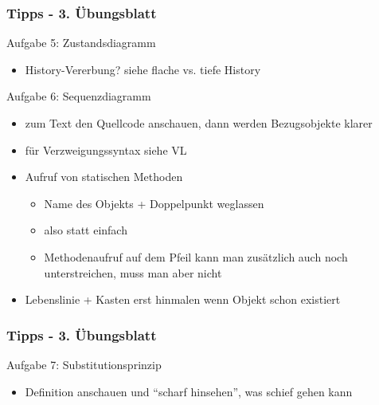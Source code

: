 \documentclass[18pt]{beamer}
\begin{document}
	\begin{frame}
		\frametitle{Tipps - 3. Übungsblatt}
			\begin{exampleblock}{Aufgabe 5: Zustandsdiagramm}
				\begin{itemize}
					\pause
					\item History-Vererbung? siehe flache vs. tiefe History
				\end{itemize}
			\end{exampleblock}
			\pause
			\begin{exampleblock}{Aufgabe 6: Sequenzdiagramm}
				\begin{itemize}
					\item zum Text den Quellcode anschauen, dann werden Bezugsobjekte klarer
					\pause
					\item für Verzweigungssyntax siehe VL
					\pause
					\item Aufruf von statischen Methoden
					\begin{itemize}
						\item Name des Objekts + Doppelpunkt weglassen
						\item also statt  einfach 
						\item Methodenaufruf auf dem Pfeil kann man zusätzlich auch noch unterstreichen, muss man aber nicht
					\end{itemize}  
					\pause
					\item Lebenslinie + Kasten erst hinmalen wenn Objekt schon existiert
				\end{itemize}
			\end{exampleblock}
	\end{frame}

	\begin{frame}
\frametitle{Tipps - 3. Übungsblatt}
\begin{exampleblock}{Aufgabe 7: Substitutionsprinzip}
	\begin{itemize}
		\item Definition anschauen und \enquote{scharf hinsehen}, was schief gehen kann
	\end{itemize}
\end{exampleblock}
\end{frame}
\end{document}
